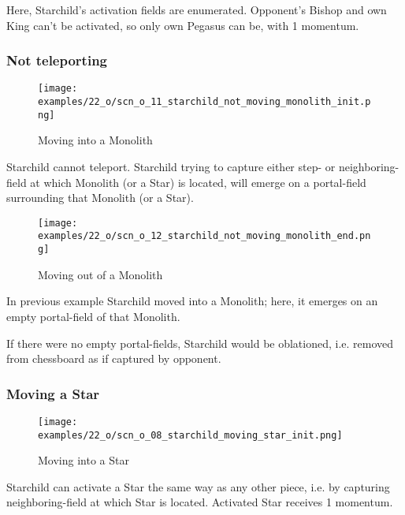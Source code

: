 Here, Starchild’s activation fields are enumerated. Opponent's Bishop and own King can't
be activated, so only own Pegasus can be, with 1 momentum.

\clearpage %

\subsubsection*{Not teleporting}

\noindent
\begin{wrapfigure}[6]{l}{0.4\textwidth}
\centering
\texttt{[image: examples/22\_o/scn\_o\_11\_starchild\_not\_moving\_monolith\_init.png]}
\caption{Moving into a Monolith}
\label{fig:scn_o_11_starchild_not_moving_monolith_init}
\end{wrapfigure}
Starchild cannot teleport. Starchild trying to capture either step- or neighboring-field at
which Monolith (or a Star) is located, will emerge on a portal-field surrounding that
Monolith (or a Star).

\vspace*{5.1\baselineskip}
\noindent
\begin{wrapfigure}[8]{l}{0.4\textwidth}
\centering
\texttt{[image: examples/22\_o/scn\_o\_12\_starchild\_not\_moving\_monolith\_end.png]}
\caption{Moving out of a Monolith}
\label{fig:scn_o_12_starchild_not_moving_monolith_end}
\end{wrapfigure}
In previous example Starchild moved into a Monolith; here, it emerges on an empty portal-field
of that Monolith.

If there were no empty portal-fields, Starchild would be oblationed, i.e. removed from chessboard
as if captured by opponent.

\clearpage %

\subsubsection*{Moving a Star}

\noindent
\begin{wrapfigure}[5]{l}{0.4\textwidth}
\centering
\texttt{[image: examples/22\_o/scn\_o\_08\_starchild\_moving\_star\_init.png]}
\caption{Moving into a Star}
\label{fig:scn_o_08_starchild_moving_star_init}
\end{wrapfigure}
Starchild can activate a Star the same way as any other piece, i.e. by capturing
neighboring-field at which Star is located. Activated Star receives 1 momentum.

